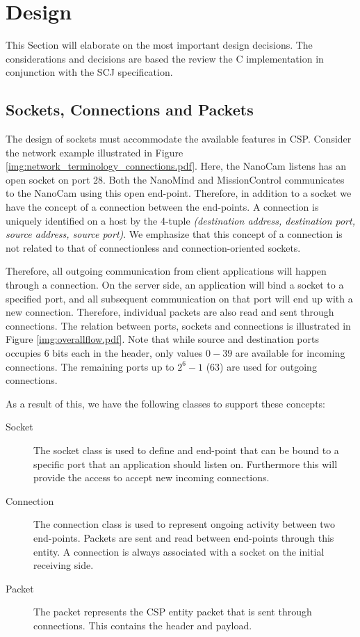 \section{Design}
This Section will elaborate on the most important design decisions. The considerations and decisions are based the review the C implementation in conjunction with the SCJ specification.

\subsection{Sockets, Connections and Packets}
The design of sockets must accommodate the available features in CSP. Consider the network example illustrated in Figure \ref{img:network_terminology_connections.pdf}. Here, the NanoCam listens has an open socket on port 28. Both the NanoMind and MissionControl communicates to the NanoCam using this open end-point. Therefore, in addition to a socket we have the concept of a connection between the end-points. A connection is uniquely identified on a host by the 4-tuple \textit{(destination address, destination port, source address, source port)}. We emphasize that this concept of a connection is not related to that of connectionless and connection-oriented sockets.

Therefore, all outgoing communication from client applications will happen through a connection. On the server side, an application will bind a socket to a specified port, and all subsequent communication on that port will end up with a new connection. Therefore, individual packets are also read and sent through connections. The relation between ports, sockets and connections is illustrated in Figure \ref{img:overallflow.pdf}. Note that while source and destination ports occupies 6 bits each in the header, only values $0-39$ are available for incoming connections. The remaining ports up to $2^6-1$ (63) are used for outgoing connections.

As a result of this, we have the following classes to support these concepts:
\begin{description}
	\item[Socket] The socket class is used to define and end-point that can be bound to a specific port that an application should listen on. Furthermore this will provide the access to accept new incoming connections.
	\item[Connection] The connection class is used to represent ongoing activity between two end-points. Packets are sent and read between end-points through this entity. A connection is always associated with a socket on the initial receiving side.
	\item[Packet] The packet represents the CSP entity packet that is sent through connections. This contains the header and payload.
\end{description}
